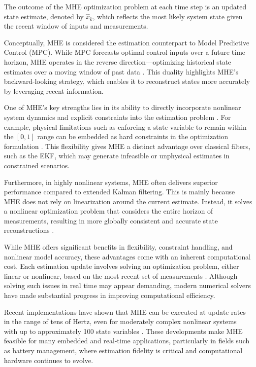 The outcome of the MHE optimization problem at each time step is an updated state estimate, denoted by $\hat{x}_k$, which reflects the most likely system state given the recent window of inputs and measurements.

Conceptually, MHE is considered the estimation counterpart to Model Predictive Control (MPC). While MPC forecasts optimal control inputs over a future time horizon, MHE operates in the reverse direction—optimizing historical state estimates over a moving window of past data \cite{ZHANG2023108381}. This duality highlights MHE's backward-looking strategy, which enables it to reconstruct states more accurately by leveraging recent information.

One of MHE's key strengths lies in its ability to directly incorporate nonlinear system dynamics and explicit constraints into the estimation problem \cite{KARG2021107266}. For example, physical limitations such as enforcing a state variable to remain within the $[0, 1]$ range can be embedded as hard constraints in the optimization formulation \cite{Rao}. This flexibility gives MHE a distinct advantage over classical filters, such as the EKF, which may generate infeasible or unphysical estimates in constrained scenarios.

Furthermore, in highly nonlinear systems, MHE often delivers superior performance compared to extended Kalman filtering. This is mainly because MHE does not rely on linearization around the current estimate. Instead, it solves a nonlinear optimization problem that considers the entire horizon of measurements, resulting in more globally consistent and accurate state reconstructions \cite{Haseltine}.


While MHE offers significant benefits in flexibility, constraint handling, and nonlinear model accuracy, these advantages come with an inherent computational cost. Each estimation update involves solving an optimization problem, either linear or nonlinear, based on the most recent set of measurements \cite{Kraus}. Although solving such issues in real time may appear demanding, modern numerical solvers have made substantial progress in improving computational efficiency.

Recent implementations have shown that MHE can be executed at update rates in the range of tens of Hertz, even for moderately complex nonlinear systems with up to approximately 100 state variables \cite{Vukov}. These developments make MHE feasible for many embedded and real-time applications, particularly in fields such as battery management, where estimation fidelity is critical and computational hardware continues to evolve.

